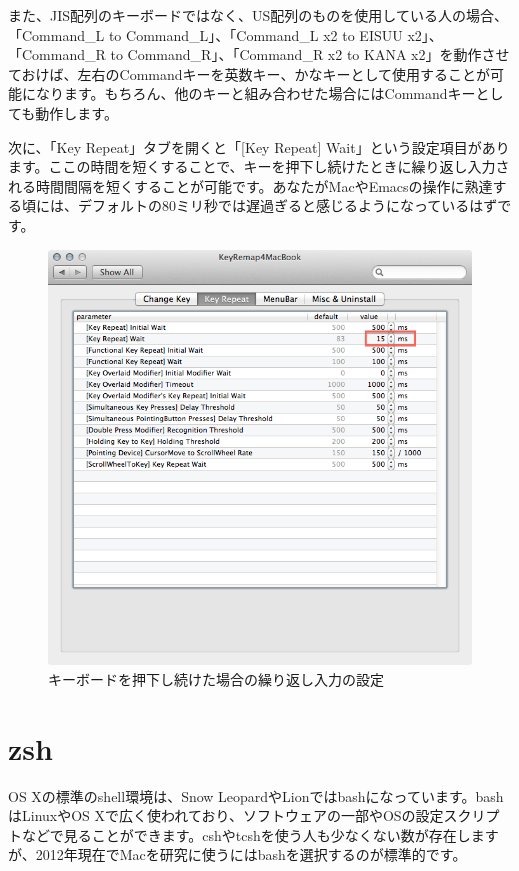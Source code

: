 また、JIS配列のキーボードではなく、US配列のものを使用している人の場合、「Command\_L to Command\_L」、「Command\_L x2 to EISUU x2」、「Command\_R to Command\_R」、「Command\_R x2 to KANA x2」を動作させておけば、左右のCommandキーを英数キー、かなキーとして使用することが可能になります。もちろん、他のキーと組み合わせた場合にはCommandキーとしても動作します。

次に、「Key Repeat」タブを開くと「[Key Repeat] Wait」という設定項目があります。ここの時間を短くすることで、キーを押下し続けたときに繰り返し入力される時間間隔を短くすることが可能です。あなたがMacやEmacsの操作に熟達する頃には、デフォルトの$80$ミリ秒では遅過ぎると感じるようになっているはずです。

\begin{figure}
  \begin{center}
    \includegraphics[scale=0.35,bb= 0 0 668 655]{fig/KeyRemap4MacBook2.png}
    \caption{キーボードを押下し続けた場合の繰り返し入力の設定}
    \label{fig_KeyRemap4MacBook2_png}
  \end{center}
\end{figure}

\section{zsh}

OS Xの標準のshell環境は、Snow LeopardやLionではbashになっています。bashはLinuxやOS Xで広く使われており、ソフトウェアの一部やOSの設定スクリプトなどで見ることができます。cshやtcshを使う人も少なくない数が存在しますが、2012年現在でMacを研究に使うにはbashを選択するのが標準的です。

